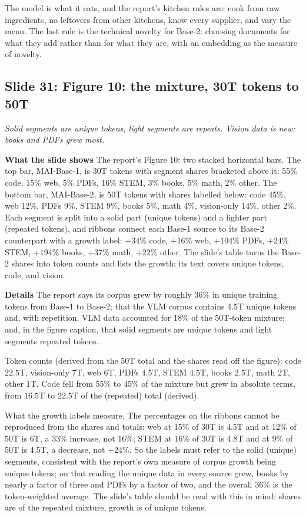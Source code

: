 \documentclass[11pt,letterpaper]{article}
\newcommand{\slide}[3]{%
  \subsection[Slide #1: #2]{Slide #1: #2}%
  {\color{muted}\itshape #3\par}\medskip}
\newcommand{\para}[1]{\medskip\noindent\textbf{#1}\quad}
\newenvironment{intuition}{\begin{tcolorbox}[intuitionbox]}{\end{tcolorbox}}
\begin{document}
\begin{intuition}
The model is what it eats, and the report's kitchen rules are: cook from raw ingredients, no leftovers from other kitchens, know every supplier, and vary the menu. The last rule is the technical novelty for Base-2: choosing documents for what they add rather than for what they are, with an embedding as the measure of novelty.
\end{intuition}

\slide{31}{Figure 10: the mixture, 30T tokens to 50T}{Solid segments are unique tokens, light segments are repeats. Vision data is new; books and PDFs grew most.}

\para{What the slide shows} The report's Figure 10: two stacked horizontal bars. The top bar, MAI-Base-1, is 30T tokens with segment shares bracketed above it: 55\% code, 15\% web, 5\% PDFs, 16\% STEM, 3\% books, 5\% math, 2\% other. The bottom bar, MAI-Base-2, is 50T tokens with shares labelled below: code 45\%, web 12\%, PDFs 9\%, STEM 9\%, books 5\%, math 4\%, vision-only 14\%, other 2\%. Each segment is split into a solid part (unique tokens) and a lighter part (repeated tokens), and ribbons connect each Base-1 source to its Base-2 counterpart with a growth label: $+34\%$ code, $+16\%$ web, $+104\%$ PDFs, $+24\%$ STEM, $+194\%$ books, $+37\%$ math, $+22\%$ other. The slide's table turns the Base-2 shares into token counts and lists the growth; its text covers unique tokens, code, and vision.

\para{Details} The report says its corpus grew by roughly 36\% in unique training tokens from Base-1 to Base-2; that the VLM corpus contains 4.5T unique tokens and, with repetition, VLM data accounted for 18\% of the 50T-token mixture; and, in the figure caption, that solid segments are unique tokens and light segments repeated tokens.

Token counts (derived from the 50T total and the shares read off the figure): code $22.5$T, vision-only $7$T, web $6$T, PDFs $4.5$T, STEM $4.5$T, books $2.5$T, math $2$T, other $1$T. Code fell from 55\% to 45\% of the mixture but grew in absolute terms, from $16.5$T to $22.5$T of the (repeated) total (derived).

What the growth labels measure. The percentages on the ribbons cannot be reproduced from the shares and totals: web at 15\% of 30T is 4.5T and at 12\% of 50T is 6T, a 33\% increase, not 16\%; STEM at 16\% of 30T is 4.8T and at 9\% of 50T is 4.5T, a decrease, not $+24\%$. So the labels must refer to the solid (unique) segments, consistent with the report's own measure of corpus growth being unique tokens; on that reading the unique data in every source grew, books by nearly a factor of three and PDFs by a factor of two, and the overall 36\% is the token-weighted average. The slide's table should be read with this in mind: shares are of the repeated mixture, growth is of unique tokens.
\end{document}
